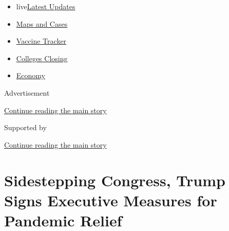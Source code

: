 \begin{itemize}
\tightlist
\item
  live\href{https://www.nytimes3xbfgragh.onion/2020/08/20/world/coronavirus-covid.html?name=styln-coronavirus-national\&region=TOP_BANNER\&variant=undefined\&block=storyline_menu_recirc\&action=click\&pgtype=Article\&impression_id=4d99ba51-e384-11ea-80c5-a5fa522d855a}{Latest
  Updates}
\item
  \href{https://www.nytimes3xbfgragh.onion/interactive/2020/us/coronavirus-us-cases.html?name=styln-coronavirus-national\&region=TOP_BANNER\&variant=undefined\&block=storyline_menu_recirc\&action=click\&pgtype=Article\&impression_id=4d99ba52-e384-11ea-80c5-a5fa522d855a}{Maps
  and Cases}
\item
  \href{https://www.nytimes3xbfgragh.onion/interactive/2020/science/coronavirus-vaccine-tracker.html?name=styln-coronavirus-national\&region=TOP_BANNER\&variant=undefined\&block=storyline_menu_recirc\&action=click\&pgtype=Article\&impression_id=4d99ba53-e384-11ea-80c5-a5fa522d855a}{Vaccine
  Tracker}
\item
  \href{https://www.nytimes3xbfgragh.onion/2020/08/19/us/colleges-closing-covid.html?name=styln-coronavirus-national\&region=TOP_BANNER\&variant=undefined\&block=storyline_menu_recirc\&action=click\&pgtype=Article\&impression_id=4d99ba54-e384-11ea-80c5-a5fa522d855a}{Colleges
  Closing}
\item
  \href{https://www.nytimes3xbfgragh.onion/live/2020/08/20/business/stock-market-today-coronavirus?name=styln-coronavirus-national\&region=TOP_BANNER\&variant=undefined\&block=storyline_menu_recirc\&action=click\&pgtype=Article\&impression_id=4d99ba55-e384-11ea-80c5-a5fa522d855a}{Economy}
\end{itemize}

Advertisement

\protect\hyperlink{after-top}{Continue reading the main story}

Supported by

\protect\hyperlink{after-sponsor}{Continue reading the main story}

\hypertarget{sidestepping-congress-trump-signs-executive-measures-for-pandemic-relief}{%
\section{Sidestepping Congress, Trump Signs Executive Measures for
Pandemic
Relief}\label{sidestepping-congress-trump-signs-executive-measures-for-pandemic-relief}}

